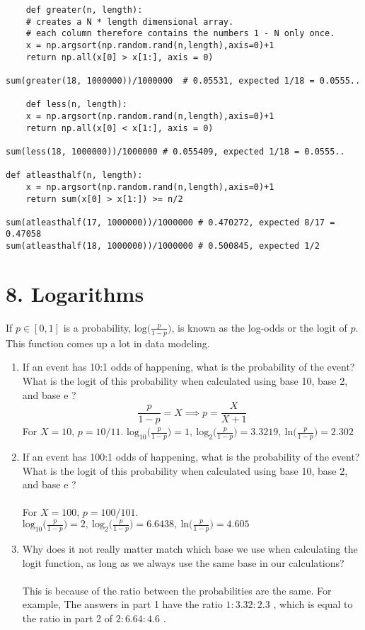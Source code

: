 \documentclass[11pt]{report}
\begin{document}
\hrulefill


\begin{verbatim}
	def greater(n, length):
    # creates a N * length dimensional array.
    # each column therefore contains the numbers 1 - N only once.
    x = np.argsort(np.random.rand(n,length),axis=0)+1
    return np.all(x[0] > x[1:], axis = 0)

sum(greater(18, 1000000))/1000000  # 0.05531, expected 1/18 = 0.0555..

	def less(n, length):
    x = np.argsort(np.random.rand(n,length),axis=0)+1
    return np.all(x[0] < x[1:], axis = 0)

sum(less(18, 1000000))/1000000 # 0.055409, expected 1/18 = 0.0555..

def atleasthalf(n, length):
    x = np.argsort(np.random.rand(n,length),axis=0)+1
    return sum(x[0] > x[1:]) >= n/2

sum(atleasthalf(17, 1000000))/1000000 # 0.470272, expected 8/17 = 0.47058
sum(atleasthalf(18, 1000000))/1000000 # 0.500845, expected 1/2 

\end{verbatim}




\newpage
\section*{8. Logarithms}
If $p \in [0,1]$ is a probability, $\text{log}\big(\frac{p}{1-p}\big)$, is known as the log-odds or the logit of $p$. This function comes up a lot in data modeling. 
\begin{enumerate}
	\item If an event has 10:1 odds of happening, what is the probability of the event? What is the logit of this probability when calculated using base 10, base 2, and base e ? \\ $$ \frac{p}{1-p}  =X\implies p = \frac{X}{X+1} $$ For $X = 10$, $p = 10/11$. $\text{log}_{10}\big(\frac{p}{1-p}\big) = 1, \ \text{log}_{2}\big(\frac{p}{1-p}\big) = 3.3219, \ \text{ln}\big(\frac{p}{1-p}\big) = 2.302$
	\item If an event has 100:1 odds of happening, what is the probability of the event? What is the logit of this probability when calculated using base 10, base 2, and base e ? \\ \\For $X = 100$, $p = 100/101$. $\text{log}_{10}\big(\frac{p}{1-p}\big) = 2, \ \text{log}_{2}\big(\frac{p}{1-p}\big) = 6.6438, \ \text{ln}\big(\frac{p}{1-p}\big) = 4.605$
	\item Why does it not really matter match which base we use when calculating the logit  function, as long as we always use the same base in our calculations? \\ \\ This is because of the ratio between the probabilities are the same. For example, The answers in part 1 have the ratio $1:3.32:2.3$ , which is equal to the ratio in part 2 of $ 2:6.64:4.6$ . 
	

\end{enumerate}
\end{document}
